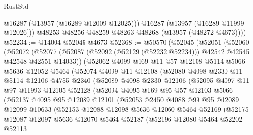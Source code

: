 \begin{lexlean}{RustStd}
\begin{coremodule}
            @16287
            (@13957 (@16289 @12009 @12025)))
          @16287
          (@13957 (@16289 @11999 @12026)))
        @48253
        @48256
        @48259
        @48263
        @48268
        (@13957 (@48272 @4673))))
@52234 := @14004 @52046 @4673
@52368 := @50570
    (@52045
      (@52051
        (@52060
          (@52072
            (@52077 (@52087 (@52092 (@52129 (@52232 @52234))) @42542 @42545 @42548 @42551 @14033))
            (@52062
              @4099
              @169
              @11
              @57
              @12108
              @5114
              @5066
              @5636
              @12052
              @5464
              (@52074
                @4099
                @11
                @12108
                (@52080
                  @4098
                  @2330
                  @11
                  @5114
                  @12106
                  @4755
                  @2340
                  (@52089
                    @4098
                    @2330
                    @12106
                    (@52095
                      @4097
                      @11
                      @97
                      @11993
                      @12105
                      @52128
                      (@52094
                        @4095
                        @169
                        @95
                        @57
                        @12103
                        @5066
                        (@52137
                          @4095
                          @95
                          @12089
                          @12101
                          (@52053
                            @2450
                            @4088
                            @99
                            @95
                            @12089
                            @12099
                            @10633
                            (@52153
                              @12088
                              @12098
                              @5636
                              @12060
                              @5464
                              @52169
                              (@52175
                                @12087
                                @12097
                                @5636
                                @12070
                                @5464
                                @52187
                                (@52196
                                  @12080
                                  @5464
                                  @52202
                                  @52113

\end{coremodule}
\end{lexlean}

